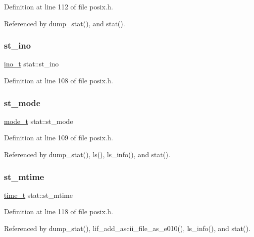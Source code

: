 Definition at line 112 of file posix.\+h.



Referenced by dump\+\_\+stat(), and stat().

\mbox{\label{structstat_a9769ed8f0d4c5a9f329c32bc92479d56}} 
\subsubsection{\texorpdfstring{st\+\_\+ino}{st\_ino}}
{\footnotesize\ttfamily \hyperlink{posix_8h_aed4e918b44240739869c4bdb1c4787a9}{ino\+\_\+t} stat\+::st\+\_\+ino}



Definition at line 108 of file posix.\+h.

\mbox{\label{structstat_a5cbdd829011af82ba61e83773bbcbc7d}} 
\subsubsection{\texorpdfstring{st\+\_\+mode}{st\_mode}}
{\footnotesize\ttfamily \hyperlink{posix_8h_af8f4385bb42836d1e3ad4fea9d71d1b9}{mode\+\_\+t} stat\+::st\+\_\+mode}



Definition at line 109 of file posix.\+h.



Referenced by dump\+\_\+stat(), ls(), ls\+\_\+info(), and stat().

\mbox{\label{structstat_a77e235090f8cb6897f1c0ce65689006b}} 
\subsubsection{\texorpdfstring{st\+\_\+mtime}{st\_mtime}}
{\footnotesize\ttfamily \hyperlink{time_8h_a3346b04b0420b32ccf6b706551b70762}{time\+\_\+t} stat\+::st\+\_\+mtime}



Definition at line 118 of file posix.\+h.



Referenced by dump\+\_\+stat(), lif\+\_\+add\+\_\+ascii\+\_\+file\+\_\+as\+\_\+e010(), ls\+\_\+info(), and stat().

